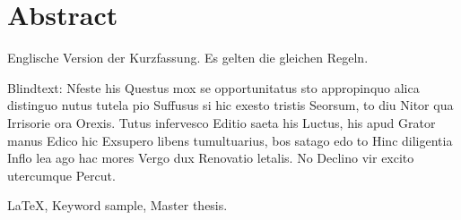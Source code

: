 \chapter*{Abstract} 
Englische Version der Kurzfassung. Es gelten die gleichen Regeln.

Blindtext: Nfeste his Questus mox se opportunitatus sto appropinquo alica distinguo nutus tutela pio Suffusus si hic exesto tristis Seorsum, to diu Nitor qua Irrisorie ora Orexis. Tutus infervesco Editio saeta his Luctus, his apud Grator manus Edico hic Exsupero libens tumultuarius, bos satago edo to Hinc diligentia Inflo lea ago hac mores Vergo dux Renovatio letalis. No Declino vir excito utercumque Percut.

\begin{keywords}
\LaTeX, Keyword sample, Master thesis.
\end{keywords}